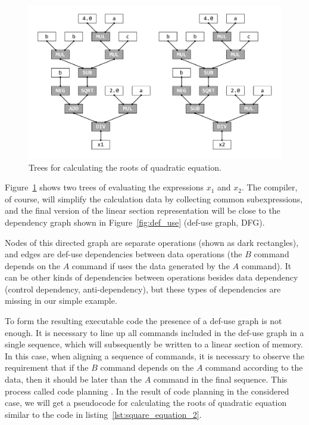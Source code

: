 \documentclass[
11pt,%
tightenlines,%
twoside,%
onecolumn,%
nofloats,%
nobibnotes,%
nofootinbib,%
superscriptaddress,%
noshowpacs,%
centertags]%
{revtex4}
\begin{document}
\begin{figure}[h]
\includegraphics[width=1.05\textwidth]{pics/square_equation_calculation_tree.pdf}
\caption{Trees for calculating the roots of quadratic equation.}\label{fig:square_equation_calculation_tree}
\end{figure}

Figure~\ref{fig:square_equation_calculation_tree} shows two trees of evaluating the expressions $x_1$ and $x_2$.
The compiler, of course, will simplify the calculation data by collecting common subexpressions, and the final version of the linear section representation will be close to the dependency graph shown in Figure~\ref{fig:def_use} (def-use graph, DFG).

Nodes of this directed graph are separate operations (shown as dark rectangles), and edges are def-use dependencies between data operations (the $B$ command depends on the $A$ command if uses the data generated by the $A$ command).
It can be other kinds of dependencies between operations besides data dependency (control dependency, anti-dependency), but these types of dependencies are missing in our simple example.

To form the resulting executable code the presence of a def-use graph is not enough.
It is necessary to line up all commands included in the def-use graph in a single sequence, which will subsequently be written to a linear section of memory.
In this case, when aligning a sequence of commands, it is necessary to observe the requirement that if the $B$ command depends on the $A$ command according to the data, then it should be later than the $A$ command in the final sequence.
This process called code planning \cite{Aho}.
In the result of code planning in the considered case, we will get a pseudocode for calculating the roots of quadratic equation similar to the code in listing~\ref{lst:square_equation_2}.
\end{document}
